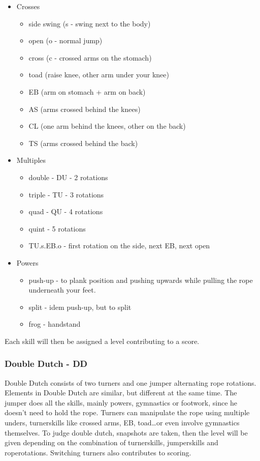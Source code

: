 \begin{itemize}
    \item Crosses
    \begin{itemize}
        \item side swing (s - swing next to the body)
        \item open (o - normal jump)
        \item cross (c - crossed arms on the stomach)
        \item toad (raise knee, other arm under your knee)
        \item EB (arm on stomach + arm on back)
        \item AS (arms crossed behind the knees)
        \item CL (one arm behind the knees, other on the back)
        \item TS (arms crossed behind the back)
    \end{itemize}
    \item Multiples
    \begin{itemize}
        \item double - DU - 2 rotations
        \item triple - TU - 3 rotations
        \item quad - QU - 4 rotations
        \item quint - 5 rotations
        \item TU.s.EB.o - first rotation on the side, next EB, next open
    \end{itemize}
    \item Powers
    \begin{itemize}
        \item push-up - to plank position and pushing upwards while pulling the rope underneath your feet.
        \item split - idem push-up, but to split
        \item frog - handstand
    \end{itemize}
\end{itemize}

Each skill will then be assigned a level contributing to a score. 

\subsubsection{Double Dutch - DD}
\label{subsubsec:double dutch}

Double Dutch consists of two turners and one jumper alternating rope rotations. Elements in Double Dutch are similar, but different at the same time. The jumper does all the skills, mainly powers, gymnastics or footwork, since he doesn't need to hold the rope. Turners can manipulate the rope using multiple unders, turnerskills like crossed arms, EB, toad\dots or even involve gymnastics themselves.
To judge double dutch, snapshots are taken, then the level will be given depending on the combination of turnerskills, jumperskills and roperotations.
Switching turners also contributes to scoring.

